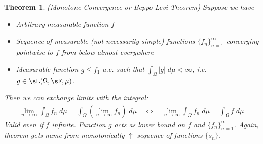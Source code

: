 \documentclass[12pt]{article}
\theoremstyle{plain}
\newtheorem{thm}{Theorem}[section]
\theoremstyle{definition}
\theoremstyle{remark}
\newcommand{\ninf}{_{n=1}^\infty}
\begin{document}
\begin{thm}\emph{(Monotone Convergence or Beppo-Levi Theorem)}
\label{mct:strong}
Suppose we have
\begin{itemize}
  \item Arbitrary measurable function $f$
  \item Sequence of measurable (not necessarily simple) functions
    $\{f_n\}\ninf$ converging pointwise to $f$ from below almost
    everywhere
  \item Measurable function $g\leq f_1$ a.e. such that
    $\int_\Omega|g|\;d\mu<\infty$,
    i.e. $g\in\sL(\Omega,\sF,\mu)$.
\end{itemize}
Then we can exchange limits with the integral:
\begin{align*}
    \lim_{n\rightarrow\infty} \int_\Omega f_n \; d\mu =
    \int_\Omega \left(\lim_{n\rightarrow\infty} f_n\right)
    \; d\mu
    \quad\iff\quad
    \lim_{n\rightarrow\infty} \int_\Omega f_n \; d\mu =
    \int_\Omega f \; d\mu
\end{align*}
Valid even if $f$ infinite.
Function $g$ acts as lower bound on $f$ and $\{f_n\}\ninf$.
Again, theorem gets name from monotonically $\uparrow$ sequence of
functions $\{s_n\}$.
\end{thm}
\end{document}
